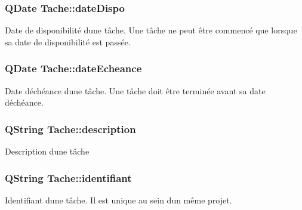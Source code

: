 \subsubsection[{date\+Dispo}]{\setlength{\rightskip}{0pt plus 5cm}Q\+Date Tache\+::date\+Dispo\hspace{0.3cm}{\ttfamily [protected]}}\label{class_tache_ac8758b826b1be639dad8bcb556659a36}
Date de disponibilité d\textquotesingle{}une tâche. Une tâche ne peut être commencé que lorsque sa date de disponibilité est passée. \hypertarget{class_tache_a7671c127da40ae35075f069a64396f45}{}
\subsubsection[{date\+Echeance}]{\setlength{\rightskip}{0pt plus 5cm}Q\+Date Tache\+::date\+Echeance\hspace{0.3cm}{\ttfamily [protected]}}\label{class_tache_a7671c127da40ae35075f069a64396f45}
Date d\textquotesingle{}échéance d\textquotesingle{}une tâche. Une tâche doit être terminée avant sa date d\textquotesingle{}échéance. \hypertarget{class_tache_ab3d06410b2c62ebfbe20f570c41dc4d4}{}
\subsubsection[{description}]{\setlength{\rightskip}{0pt plus 5cm}Q\+String Tache\+::description\hspace{0.3cm}{\ttfamily [protected]}}\label{class_tache_ab3d06410b2c62ebfbe20f570c41dc4d4}
Description d\textquotesingle{}une tâche \hypertarget{class_tache_a9af1773c9b835900bba8814cccee450e}{}
\subsubsection[{identifiant}]{\setlength{\rightskip}{0pt plus 5cm}Q\+String Tache\+::identifiant\hspace{0.3cm}{\ttfamily [protected]}}\label{class_tache_a9af1773c9b835900bba8814cccee450e}
Identifiant d\textquotesingle{}une tâche. Il est unique au sein d\textquotesingle{}un même projet. \hypertarget{class_tache_a0f73920789e27b7c2aeb47d171d5e543}{}
